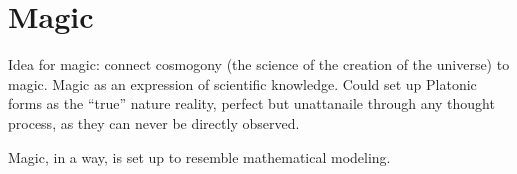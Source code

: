 
\chapter{Magic}

Idea for magic: connect cosmogony (the science of the creation of the universe)
to magic. Magic as an expression of scientific knowledge. Could set up Platonic
forms as the ``true'' nature reality, perfect but unattanaile through any
thought process, as they can never be directly observed.

Magic, in a way, is set up to resemble mathematical modeling.

